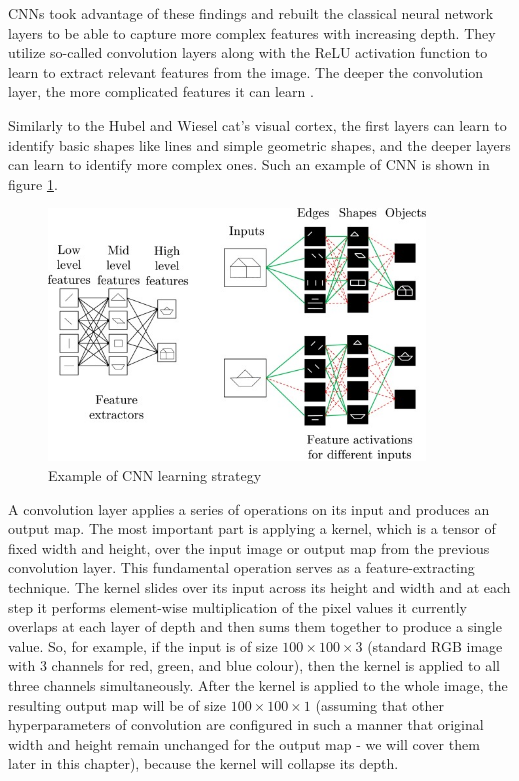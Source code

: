 CNNs took advantage of these findings and rebuilt the classical neural network layers to be able to capture more complex features with increasing depth. They utilize so-called convolution layers along with the ReLU activation function to learn to extract relevant features from the image. The deeper the convolution layer, the more complicated features it can learn \cite{Santosh2022-2}. 

Similarly to the Hubel and Wiesel cat's visual cortex, the first layers can learn to identify basic shapes like lines and simple geometric shapes, and the deeper layers can learn to identify more complex ones. Such an example of CNN is shown in figure \ref{fig:cnn}.

\begin{figure}[H]
\begin{centering}
\includegraphics[width=10cm]{assets/images/cnn.jpg}
\par\end{centering}
\caption{Example of CNN learning strategy \cite{Santosh2022-2}}
\label{fig:cnn}
\end{figure}

A convolution layer applies a series of operations on its input and produces an output map. The most important part is applying a kernel, which is a tensor of fixed width and height, over the input image or output map from the previous convolution layer. This fundamental operation serves as a feature-extracting technique. The kernel slides over its input across its height and width and at each step it performs element-wise multiplication of the pixel values it currently overlaps at each layer of depth and then sums them together to produce a single value. So, for example, if the input is of size $100\times100\times3$ (standard RGB image with 3 channels for red, green, and blue colour), then the kernel is applied to all three channels simultaneously. After the kernel is applied to the whole image, the resulting output map will be of size $100\times100\times1$ (assuming that other hyperparameters of convolution are configured in such a manner that original width and height remain unchanged for the output map - we will cover them later in this chapter), because the kernel will collapse its depth. 

